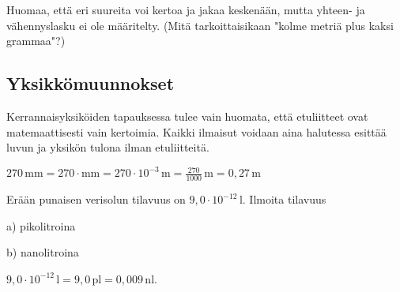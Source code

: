 



Huomaa, että eri suureita voi kertoa ja jakaa keskenään, mutta yhteen- ja vähennyslasku ei ole määritelty. (Mitä tarkoittaisikaan "kolme metriä plus kaksi grammaa"?)

\subsection*{Yksikkömuunnokset}

Kerrannaisyksiköiden tapauksessa tulee vain huomata, että etuliitteet ovat matemaattisesti vain kertoimia. Kaikki ilmaisut voidaan aina halutessa esittää luvun ja yksikön tulona ilman etuliitteitä. %

\begin{esimerkki}
$270\,\text{mm}=270\cdot\text{mm}=270\cdot10^{-3}\,\text{m}=\frac{270}{1000}\,\text{m}=0,27\,\text{m}$
\end{esimerkki}

\begin{esimerkki}
Erään punaisen verisolun tilavuus on $9,0 \cdot 10^{-12}\,\textrm{l}$. Ilmoita tilavuus

a) pikolitroina

b) nanolitroina

\begin{esimratk}
$9,0 \cdot 10^{-12}\,\textrm{l} = 9,0\,\textrm{pl} = 0,009\,\textrm{nl}$.
\end{esimratk}
\end{esimerkki}


